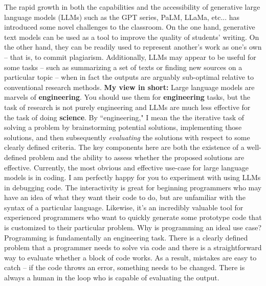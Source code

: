 \documentclass[11pt, article, oneside]{memoir}
\theoremstyle{Assumption}
\begin{document}
The rapid growth in both the capabilities and the accessibility of generative large language models (LLMs) such as the GPT series, PaLM, LLaMa, etc... has introduced some novel challenges to the classroom. On the one hand, generative text models can be used as a tool to improve the quality of students' writing. On the other hand, they can be readily used to represent another's work as one's own -- that is, to commit plagiarism. Additionally, LLMs may appear to be useful for some tasks -- such as summarizing a set of texts or finding new sources on a particular topic -- when in fact the outputs are arguably sub-optimal relative to conventional research methods.
\newline\newline
\textbf{My view in short:} Large language models are marvels of \textbf{engineering}. You should use them for \textbf{engineering} tasks, but the task of research is not purely engineering and LLMs are much less effective for the task of doing \textbf{science}.
\newline\newline
By ``engineering," I mean the the iterative task of solving a problem by brainstorming potential solutions, implementing those solutions, and then subsequently \textit{evaluating} the solutions with respect to some clearly defined criteria. The key components here are both the existence of a well-defined problem and the ability to assess whether the proposed solutions are effective.
\newline\newline
Currently, the most obvious and effective use-case for large language models is in coding. I am perfectly happy for you to experiment with using LLMs in debugging code. The interactivity is great for beginning programmers who may have an idea of what they want their code to do, but are unfamiliar with the syntax of a particular language. Likewise, it's an incredibly valuable tool for experienced programmers who want to quickly generate some prototype code that is customized to their particular problem.
\newline\newline
Why is programming an ideal use case? Programming is fundamentally an engineering task. There is a clearly defined problem that a programmer needs to solve via code and there is a straightforward way to evaluate whether a block of code works. As a result, mistakes are easy to catch -- if the code throws an error, something needs to be changed. There is always a human in the loop who is capable of evaluating the output.
\end{document}
